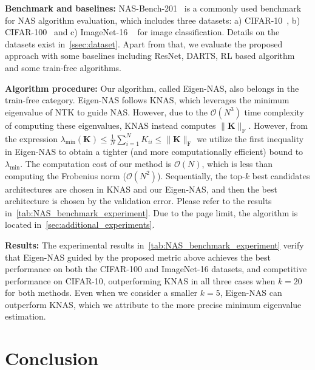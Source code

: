 \documentclass[nohyperref]{article}
\theoremstyle{plain}
\theoremstyle{definition}
\theoremstyle{remark}
\begin{document}
{\bf Benchmark and baselines:} NAS-Bench-201~\citep{dong2020nasbench201} is a commonly used benchmark for NAS algorithm evaluation, which includes three datasets: a) CIFAR-10~\citep{krizhevsky2014cifar}, b) CIFAR-100~\citep{krizhevsky2014cifar} and c) ImageNet-16 ~\citep{chrabaszcz2017downsampled} for image classification. Details on the datasets exist in~\cref{ssec:dataset}. Apart from that, we evaluate the proposed approach with some baselines including ResNet, DARTS, RL based algorithm and some train-free algorithms.




{\bf Algorithm procedure:} Our algorithm, called Eigen-NAS, also belongs in the train-free category. Eigen-NAS follows KNAS, which leverages the minimum eigenvalue of NTK to guide NAS. 
However, due to the $\mathcal{O}(N^3)$ time complexity of computing these eigenvalues, KNAS instead computes $\| \bm K \|_{\mathrm{F}}$. However, from the expression $\lambda_{\min} (\bm K) \leq \frac{1}{N}\sum_{i=1}^{N} K_{ii} \leq \| \bm K \|_{\mathrm{F}}$ we utilize the first inequality in Eigen-NAS to obtain a tighter (and more computationally efficient) bound to $\lambda_{\min}$. 
The computation cost of our method is $\mathcal{O}(N)$, which is less than computing the Frobenius norm ($\mathcal{O}(N^2)$). Sequentially, the top-$k$ best candidates architectures are chosen in KNAS and our Eigen-NAS, and then the best architecture is chosen by the validation error. Please refer to the results in~\cref{tab:NAS_benchmark_experiment}. 
Due to the page limit, the algorithm is located in~\cref{sec:additional_experiments}. 



{\bf Results:} The experimental results in~\cref{tab:NAS_benchmark_experiment} verify that Eigen-NAS guided by the proposed metric above achieves the best performance on both the CIFAR-100 and ImageNet-16 datasets, and competitive performance on CIFAR-10, outperforming KNAS in all three cases when $k=20$ for both methods. Even when we consider a smaller $k=5$, Eigen-NAS can outperform KNAS, which we attribute to the more precise minimum eigenvalue estimation. 
 \section{Conclusion}
\label{sec:conclusion}
\end{document}
